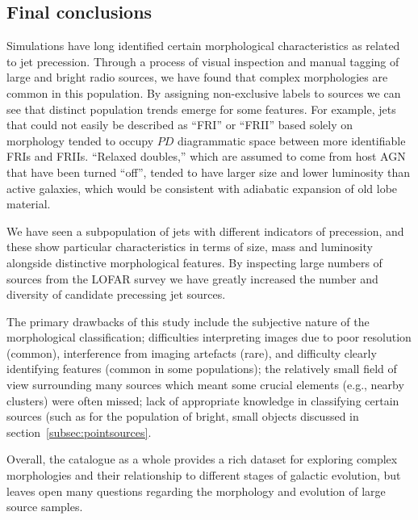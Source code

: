 \documentclass{aa}
\begin{document}
\subsection{Final conclusions}
Simulations have long identified certain morphological characteristics as related to jet precession. Through a process of visual inspection and manual tagging of large and bright radio sources, we have found that complex morphologies are common in this population. By assigning non-exclusive labels to sources we can see that distinct population trends emerge for some features. For example, jets that could not easily be described as ``FRI'' or ``FRII'' based solely on morphology tended to occupy $PD$ diagrammatic space between more identifiable FRIs and FRIIs. ``Relaxed doubles,'' which are assumed to come from host AGN that have been turned ``off'', tended to have larger size and lower luminosity than active galaxies, which would be consistent with adiabatic expansion of old lobe material. 

We have seen a subpopulation of jets with different indicators of precession, and these show particular characteristics in terms of size, mass and luminosity alongside distinctive morphological features. By inspecting large numbers of sources from the LOFAR survey we have greatly increased the number and diversity of candidate precessing jet sources.

The primary drawbacks of this study include the subjective nature of the morphological classification; difficulties interpreting images due to poor resolution (common), interference from imaging artefacts (rare), and difficulty clearly identifying features (common in some populations); the relatively small field of view surrounding many sources which meant some crucial elements (e.g., nearby clusters) were often missed; lack of appropriate knowledge in classifying certain sources (such as for the population of bright, small objects discussed in section~\ref{subsec:pointsources}.

Overall, the catalogue as a whole provides a rich dataset for exploring complex morphologies and their relationship to different stages of galactic evolution, but leaves open many questions regarding the morphology and evolution of large source samples.
\end{document}
